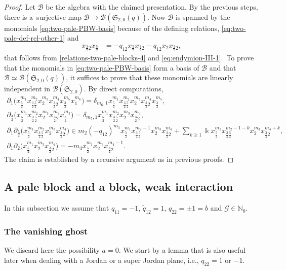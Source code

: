 \documentclass[10pt,a4paper]{amsart}
\numberwithin{equation}{section}
\newcommand{\toba}{\mathscr B}
\newcommand{\ghost}{\mathscr{G}}
\newcommand{\sele}{\mathfrak{S}}
\newcommand{\N}{{\mathbb N}}
\newcommand{\tresdos}{\frac{3}{2}}
\newcommand{\cincodos}{\frac{5}{2}}
\begin{document}
\begin{proof}
Let $\toba$ be the algebra with the claimed presentation. By the previous steps,
there is a~surjective map $\toba \to \toba(\sele_{2,0}(q))$.
Now $\toba$ is spanned by the monomials \eqref{eq:two-pale-PBW-basis} because of
the defining relations, \eqref{eq:two-pale-def-rel-other-1} and
\begin{align*}
x_{\tresdos2}x_{\cincodos} &= -q_{12} x_{\cincodos}x_{\tresdos2} - q_{12}x_{2}x_{\tresdos2},
\end{align*}
that follows from \eqref{relations-two-pale-blocks-4} and \eqref{eq:endymion-III-1}.\
To prove that the monomials in \eqref{eq:two-pale-PBW-basis} form a basis of $\toba$ and that
$\toba \simeq \toba(\sele_{2,0}(q))$, it suffices to prove that these monomials are linearly independent in $\toba(\sele_{2,0})$. By direct computations,
\begin{gather*}
\partial_1 \big(x_{\cincodos}^{m_1}x_{\tresdos\cincodos}^{m_2}x_{2}^{m_3}x_{\tresdos2}^{m_4} x_{\tresdos}^{m_5} x_1^{m_6}\big)
= \delta_{m_6,1} x_{\cincodos}^{m_1}x_{\tresdos\cincodos}^{m_2}x_{2}^{m_3}x_{\tresdos2}^{m_4} x_{\tresdos}^{m_5},
\\
\partial_{\tresdos} \big(x_{\cincodos}^{m_1}x_{\tresdos\cincodos}^{m_2}x_{2}^{m_3}x_{\tresdos2}^{m_4} x_{\tresdos}^{m_5} \big)
= \delta_{m_5,1} x_{\cincodos}^{m_1}x_{\tresdos\cincodos}^{m_2}x_{2}^{m_3}x_{\tresdos2}^{m_4},
\\
\partial_1\partial_{\cincodos} \big(x_{\cincodos}^{m_1}x_{\tresdos\cincodos}^{m_2}x_{2}^{m_3}x_{\tresdos2}^{m_4}\big)
\in m_2(-q_{12})^{m_3}x_{\cincodos}^{m_1}x_{\tresdos\cincodos}^{m_2-1}x_{2}^{m_3}x_{\tresdos2}^{m_4}
 + \sum_{k\ge1} \Bbbk x_{\cincodos}^{m_1}x_{\tresdos\cincodos}^{m_2-1-k}x_{2}^{m_3}x_{\tresdos2}^{m_4+k},
\\
\partial_1\partial_{2} \big(x_{\cincodos}^{m_1}x_{2}^{m_3}x_{\tresdos2}^{m_4}\big)
= -m_4x_{\cincodos}^{m_1}x_{2}^{m_3} x_{\tresdos2}^{m_4-1}.
\end{gather*}
The claim is established by a recursive argument as in previous proofs.
\end{proof}

\subsection{A pale block and a block, weak interaction}
In this subsection we assume that $q_{11}=- 1$,
$\widetilde{q}_{12} = 1$, $q_{22}=\pm 1=b$ and $\ghost \in \N_0$.

\subsubsection{The vanishing ghost}
We discard here the possibility $a=0$. We start by a lemma that is also useful later
when dealing with a Jordan or a super Jordan plane, i.e., $q_{22}= 1$ or $-1$.
\end{document}
